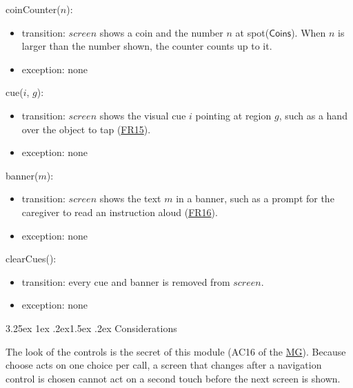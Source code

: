\documentclass[10pt, titlepage]{article}
\makeatletter
\newcommand{\srsurl}{https://team-hindsight.github.io/ophthamology-game/SRS/SRS.pdf}
\newcommand{\srsitemref}[2]{\href{\srsurl\#nameddest=#1}{#2}}
\newcommand{\mgurl}{https://github.com/team-hindsight/ophthamology-game/blob/main/pdfs/Design/SoftArchitecture/MG.pdf}
\newcommand{\mg}{\href{\mgurl}{MG}}
\renewcommand\paragraph{\@startsection{paragraph}{4}{\z@}%
  {3.25ex \@plus 1ex \@minus .2ex}{1.5ex \@plus .2ex}%
  {\normalfont\normalsize\bfseries}}
\newcommand{\T}[1]{\mathit{#1}}          %
\newcommand{\V}[1]{\mathsf{#1}}          %
\makeatother
\begin{document}
\begin{samepage}
\noindent coinCounter($n$):
\begin{itemize}
\item transition: $\T{screen}$ shows a coin and the number $n$ at
  spot($\V{Coins}$). When $n$ is larger than the number shown, the counter
  counts up to it.
\item exception: none
\end{itemize}
\end{samepage}
\par\pagebreak[0]

\begin{samepage}
\noindent cue($i$, $g$):
\begin{itemize}
\item transition: $\T{screen}$ shows the visual cue $i$ pointing at region
  $g$, such as a hand over the object to tap (\srsitemref{FR_VisualCues}{FR15}).
\item exception: none
\end{itemize}
\end{samepage}
\par\pagebreak[0]

\begin{samepage}
\noindent banner($m$):
\begin{itemize}
\item transition: $\T{screen}$ shows the text $m$ in a banner, such as a
  prompt for the caregiver to read an instruction aloud
  (\srsitemref{FR_NarrationFallback}{FR16}).
\item exception: none
\end{itemize}
\end{samepage}
\par\pagebreak[0]

\begin{samepage}
\noindent clearCues():
\begin{itemize}
\item transition: every cue and banner is removed from $\T{screen}$.
\item exception: none
\end{itemize}
\end{samepage}
\par\pagebreak[0]

\paragraph{Considerations}

The look of the controls is the secret of this module (AC16 of the \mg{}).
Because choose acts on one choice per call, a screen that changes after a
navigation control is chosen cannot act on a second touch before the next
screen is shown.
\end{document}
